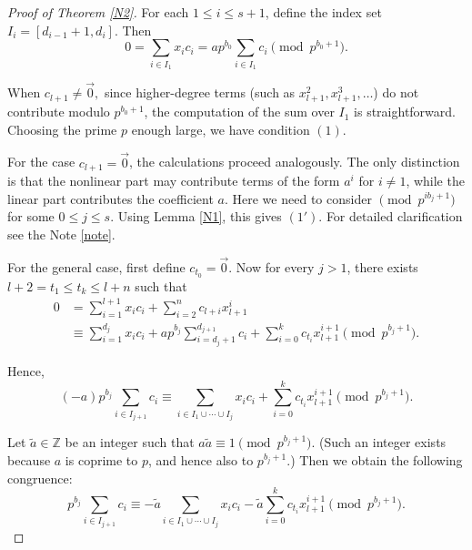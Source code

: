 \documentclass{article}
\theoremstyle{Theorem}
\theoremstyle{definition}
\begin{document}
\begin{proof}[Proof of Theorem \ref{N2}]
For each \( 1 \leq i \leq s+1 \), define the index set \( I_i = [d_{i-1}+1, d_i] \). Then
\[
0 = \sum_{i \in I_1} x_i c_i = a p^{b_0} \sum_{i \in I_1} c_i \pmod{p^{b_0+1}}.
\]

When $c_{l+1}\neq \vec 0,$ since higher-degree terms (such as \( x_{l+1}^2, x_{l+1}^3, \dots \)) do not contribute modulo \( p^{b_0+1} \), the computation of the sum over \( I_1 \) is straightforward.
Choosing the prime $p$ enough large, we have condition $(1 ).$




For the case \( c_{l+1} = \vec{0} \), the calculations proceed analogously. The only distinction is that the nonlinear part may contribute terms of the form \( a^i \) for \( i \neq 1 \), while the linear part contributes the coefficient \( a \). Here we need to consider \(\pmod{p^{ib_j+1}} \) for some $0\leq j\leq s.$ Using Lemma \ref{N1}, this gives $(1').$ For detailed clarification see the Note \ref{note}.






For the general case, first define \( c_{t_0} = \vec{0} \). Now for every \( j > 1 \), there exists \( l+2 = t_1 \leq t_k \leq l + n \) such that
\begin{align*}
    0 &= \sum_{i=1}^{l+1} x_i c_i + \sum_{i=2}^{n} c_{l+i} x_{l+1}^{i} \\
      &\equiv \sum_{i=1}^{d_j} x_i c_i + a p^{b_j} \sum_{i=d_j + 1}^{d_{j+1}} c_i + \sum_{i=0}^{k} c_{t_i} x_{l+1}^{i+1} \pmod{p^{b_j+1}}.
\end{align*}

Hence,
\[
    (-a) p^{b_j} \sum_{i \in I_{j+1}} c_i \equiv \sum_{i \in I_1 \cup \cdots \cup I_j} x_i c_i + \sum_{i=0}^{k} c_{t_i} x_{l+1}^{i+1} \pmod{p^{b_j+1}}.
\]


Let \( \tilde{a} \in \mathbb{Z} \) be an integer such that \( a \tilde{a} \equiv 1 \pmod{p^{b_j+1}} \). (Such an integer exists because \( a \) is coprime to \( p \), and hence also to \( p^{b_j+1} \).) Then we obtain the following congruence:
\begin{equation}\label{eqn1}
    p^{b_j} \sum_{i \in I_{j+1}} c_i \equiv -\tilde{a} \sum_{i \in I_1 \cup \cdots \cup I_j} x_i c_i - \tilde{a} \sum_{i=0}^{k} c_{t_i} x_{l+1}^{i+1} \pmod{p^{b_j+1}}.
\end{equation}



\end{proof}
\end{document}
